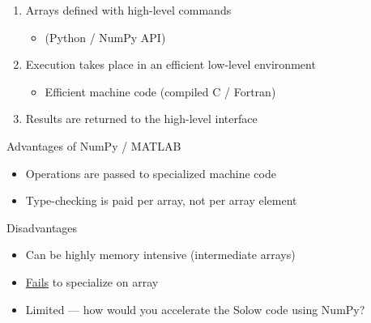 \begin{frame}
    
    \begin{enumerate}
        \item Arrays defined with high-level commands 
        \vspace{0.5em}
        \begin{itemize}
            \item (Python / NumPy API)
        \end{itemize}
        \vspace{0.5em}
        \item Execution takes place in an efficient low-level environment
        \vspace{0.5em}
        \begin{itemize}
            \item Efficient machine code (compiled C / Fortran)
        \end{itemize}
        \vspace{0.5em}
        \item Results are returned to the high-level interface
    \end{enumerate}

\end{frame}



\begin{frame}
    
    Advantages of NumPy / MATLAB

    \vspace{0.5em}
    \begin{itemize}
        \item Operations are passed to specialized machine code 
        \vspace{0.5em}
        \item Type-checking is paid per array, not per array element
    \end{itemize}

    \vspace{0.5em}
    \vspace{0.5em}
    Disadvantages 

    \begin{itemize}
        \item Can be highly memory intensive (intermediate arrays)
        \vspace{0.5em}
        \item \underline{Fails} to specialize on array 
        \vspace{0.5em}
        \item Limited --- how would you accelerate the Solow code using NumPy?
    \end{itemize}

\end{frame}







